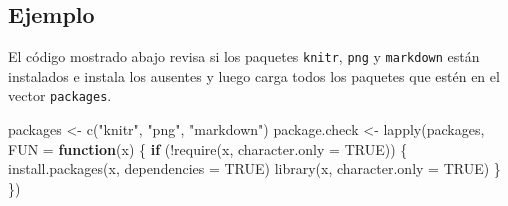 \documentclass[
]{book}
\makeatletter
\newenvironment{Shaded}{\begin{snugshade}}{\end{snugshade}}
\newcommand{\AttributeTok}[1]{\textcolor[rgb]{0.77,0.63,0.00}{#1}}
\newcommand{\ConstantTok}[1]{\textcolor[rgb]{0.00,0.00,0.00}{#1}}
\newcommand{\ControlFlowTok}[1]{\textcolor[rgb]{0.13,0.29,0.53}{\textbf{#1}}}
\newcommand{\FunctionTok}[1]{\textcolor[rgb]{0.00,0.00,0.00}{#1}}
\newcommand{\NormalTok}[1]{#1}
\newcommand{\OtherTok}[1]{\textcolor[rgb]{0.56,0.35,0.01}{#1}}
\newcommand{\SpecialCharTok}[1]{\textcolor[rgb]{0.00,0.00,0.00}{#1}}
\newcommand{\StringTok}[1]{\textcolor[rgb]{0.31,0.60,0.02}{#1}}
\newenvironment{kframe}{%
\medskip{}
\setlength{\fboxsep}{.8em}
 \def\at@end@of@kframe{}%
 \ifinner\ifhmode%
  \def\at@end@of@kframe{\end{minipage}}%
  \begin{minipage}{\columnwidth}%
 \fi\fi%
 \def\FrameCommand##1{\hskip\@totalleftmargin \hskip-\fboxsep
 \colorbox{shadecolor}{##1}\hskip-\fboxsep
     \hskip-\linewidth \hskip-\@totalleftmargin \hskip\columnwidth}%
 \MakeFramed {\advance\hsize-\width
   \@totalleftmargin\z@ \linewidth\hsize
   \@setminipage}}%
 {\par\unskip\endMakeFramed%
 \at@end@of@kframe}
\renewenvironment{Shaded}{\begin{kframe}}{\end{kframe}}
\makeatother
\begin{document}
\hypertarget{ejemplo-76}{%
\subsection*{Ejemplo}\label{ejemplo-76}}

El código mostrado abajo revisa si los paquetes \texttt{knitr}, \texttt{png} y \texttt{markdown} están instalados e instala los ausentes y luego carga todos los paquetes que estén en el vector \texttt{packages}.

\begin{Shaded}
\begin{Highlighting}[]
\NormalTok{packages }\OtherTok{\textless{}{-}}  \FunctionTok{c}\NormalTok{(}\StringTok{"knitr"}\NormalTok{, }\StringTok{"png"}\NormalTok{, }\StringTok{"markdown"}\NormalTok{)}
\NormalTok{package.check }\OtherTok{\textless{}{-}} \FunctionTok{lapply}\NormalTok{(packages, }\AttributeTok{FUN =} \ControlFlowTok{function}\NormalTok{(x) \{}
  \ControlFlowTok{if}\NormalTok{ (}\SpecialCharTok{!}\FunctionTok{require}\NormalTok{(x, }\AttributeTok{character.only =} \ConstantTok{TRUE}\NormalTok{)) \{}
    \FunctionTok{install.packages}\NormalTok{(x, }\AttributeTok{dependencies =} \ConstantTok{TRUE}\NormalTok{)}
    \FunctionTok{library}\NormalTok{(x, }\AttributeTok{character.only =} \ConstantTok{TRUE}\NormalTok{)}
\NormalTok{  \}}
\NormalTok{\})}
\end{Highlighting}
\end{Shaded}


  

\backmatter
\printindex
\end{document}
